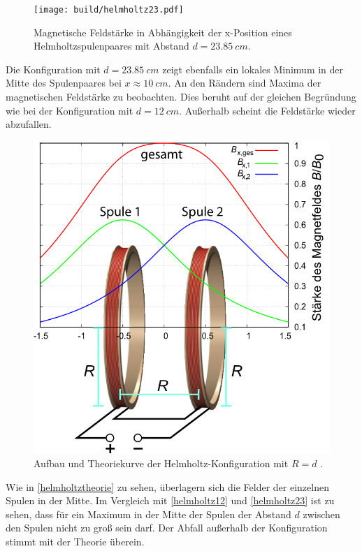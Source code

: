 \begin{figure}[H]
    \texttt{[image: build/helmholtz23.pdf]}
    \caption{Magnetische Feldstärke in Abhängigkeit der x-Position eines Helmholtzspulenpaares mit Abstand $d =\SI{23.85}{cm}$.}
    \label{helmholtz23}
\end{figure}
Die Konfiguration mit $d = \SI{23.85}{cm}$ zeigt ebenfalls ein lokales Minimum in der Mitte des Spulenpaares bei $x \approx \SI{10}{cm}$. An den Rändern sind Maxima der magnetischen Feldstärke zu beobachten.
Dies beruht auf der gleichen Begründung wie bei der Konfiguration mit $d =\SI{12}{cm}$. Außerhalb scheint die Feldstärke wieder abzufallen.
\begin{figure}[H]
    \includegraphics[width=\linewidth]{fotos/helmholtzspuletheriekurve.png}
    \caption{Aufbau und Theoriekurve der Helmholtz-Konfiguration mit $R = d$ \cite{leifi}.}
    \label{helmholtztheorie}
\end{figure}
Wie in \autoref{helmholtztheorie} zu sehen, überlagern sich die Felder der einzelnen Spulen in der Mitte. Im Vergleich mit \autoref{helmholtz12} und \autoref{helmholtz23}
ist zu sehen, dass für ein Maximum in der Mitte der Spulen der Abstand $d$ zwischen den Spulen nicht zu groß sein darf. Der Abfall außerhalb der Konfiguration stimmt
mit der Theorie überein.  
\newpage
